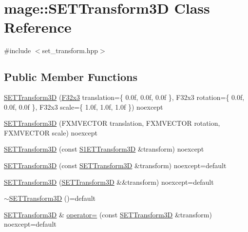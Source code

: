 \hypertarget{classmage_1_1_s_e_t_transform3_d}{}\section{mage\+:\+:S\+E\+T\+Transform3D Class Reference}
\label{classmage_1_1_s_e_t_transform3_d}


{\ttfamily \#include $<$set\+\_\+transform.\+hpp$>$}

\subsection*{Public Member Functions}
\begin{DoxyCompactItemize}
\item 
\mbox{\hyperlink{classmage_1_1_s_e_t_transform3_d_a3dcf0cca71b2dfc88634b83815c0337c}{S\+E\+T\+Transform3D}} (\mbox{\hyperlink{namespacemage_a1e3c7a882af461f161caa1cbddaf1fa2}{F32x3}} translation=\{ 0.\+0f, 0.\+0f, 0.\+0f \}, F32x3 rotation=\{ 0.\+0f, 0.\+0f, 0.\+0f \}, F32x3 scale=\{ 1.\+0f, 1.\+0f, 1.\+0f \}) noexcept
\item 
\mbox{\hyperlink{classmage_1_1_s_e_t_transform3_d_a914ea6674607c8123e5425a806b99dda}{S\+E\+T\+Transform3D}} (F\+X\+M\+V\+E\+C\+T\+OR translation, F\+X\+M\+V\+E\+C\+T\+OR rotation, F\+X\+M\+V\+E\+C\+T\+OR scale) noexcept
\item 
\mbox{\hyperlink{classmage_1_1_s_e_t_transform3_d_a1a8bcae29b922d727cc29fb911492f93}{S\+E\+T\+Transform3D}} (const \mbox{\hyperlink{classmage_1_1_s1_e_t_transform3_d}{S1\+E\+T\+Transform3D}} \&transform) noexcept
\item 
\mbox{\hyperlink{classmage_1_1_s_e_t_transform3_d_aa0a9be5e7a9d673206bbfceaa7b4826f}{S\+E\+T\+Transform3D}} (const \mbox{\hyperlink{classmage_1_1_s_e_t_transform3_d}{S\+E\+T\+Transform3D}} \&transform) noexcept=default
\item 
\mbox{\hyperlink{classmage_1_1_s_e_t_transform3_d_a76ee2cf7903877774c98c206bc52127f}{S\+E\+T\+Transform3D}} (\mbox{\hyperlink{classmage_1_1_s_e_t_transform3_d}{S\+E\+T\+Transform3D}} \&\&transform) noexcept=default
\item 
\mbox{\hyperlink{classmage_1_1_s_e_t_transform3_d_a6f9f9d406aab1e2cf80c39288bf1075d}{$\sim$\+S\+E\+T\+Transform3D}} ()=default
\item 
\mbox{\hyperlink{classmage_1_1_s_e_t_transform3_d}{S\+E\+T\+Transform3D}} \& \mbox{\hyperlink{classmage_1_1_s_e_t_transform3_d_a7eaf0bcb28dc4ab5cd83d844d726ab20}{operator=}} (const \mbox{\hyperlink{classmage_1_1_s_e_t_transform3_d}{S\+E\+T\+Transform3D}} \&transform) noexcept=default

\end{DoxyCompactItemize}
